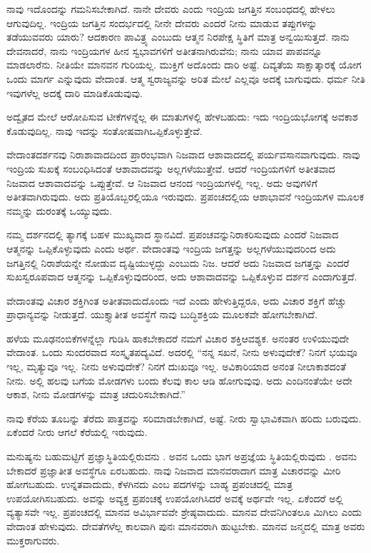 ನಾವು ಇದೊಂದನ್ನು ಗಮನಿಸಬೇಕಾಗಿದೆ. ನಾನೇ ದೇವರು ಎಂದು ಇಂದ್ರಿಯ ಜಗತ್ತಿನ ಸಂಬಂಧದಲ್ಲಿ ಹೇಳಲು ಆಗುವುದಿಲ್ಲ. ಇಂದ್ರಿಯ ಜಗತ್ತಿನ ಸಂದರ್ಭದಲ್ಲಿ ನೀನೇ ದೇವರು ಎಂದರೆ ನೀನು ಮಾಡುವ ತಪ್ಪುಗಳನ್ನು ತಡೆಯುವವರು ಯಾರು? ಆದಕಾರಣ ಪಾವಿತ್ರ್ಯ ಎಂಬುದು ಆತ್ಮನ ನಿರಪೇಕ್ಷ ಸ್ಥಿತಿಗೆ ಮಾತ್ರ ಅನ್ವಯಿಸುತ್ತದೆ. ನಾನು ದೇವನಾದರೆ, ನಾನು ಇಂದ್ರಿಯಗಳ ಹೀನ ಸ್ವಭಾವಗಳಿಗೆ ಅತೀತನಾಗಿರುವೆನು; ನಾನು ಯಾವ ಪಾಪವನ್ನೂ ಮಾಡಲಾರೆನು. ನೀತಿಯೇ ಮಾನವನ ಗುರಿಯಲ್ಲ. ಮುಕ್ತಿಗೆ ಅದೊಂದು ದಾರಿ ಅಷ್ಟೆ. ದಿವ್ಯತೆಯ ಸಾಕ್ಷಾತ್ಕಾರಕ್ಕೆ ಯೋಗ ಒಂದು ಮಾರ್ಗ ಎನ್ನುವುದು ವೇದಾಂತ. ಆತ್ಮ ಸ್ವರಾಜ್ಯವನ್ನು ಅರಿತ ಮೇಲೆ ಎಲ್ಲವೂ ಅದಕ್ಕೆ ಬಾಗುವುದು. ಧರ್ಮ ನೀತಿ ಇವುಗಳೆಲ್ಲ ಅದಕ್ಕೆ ದಾರಿ ಮಾಡಿಕೊಡುವುವು.

ಅದ್ವೈತದ ಮೇಲೆ ಆರೋಪಿಸುವ ಟೀಕೆಗಳನ್ನೆಲ್ಲ ಈ ಮಾತುಗಳಲ್ಲಿ ಹೇಳಬಹುದು: ಇದು ಇಂದ್ರಿಯಭೋಗಕ್ಕೆ ಅವಕಾಶ ಕೊಡುವುದಿಲ್ಲ. ನಾವು ಇದನ್ನು ಸಂತೋಷವಾಗಿ\break ಒಪ್ಪಿಕೊಳ್ಳುತ್ತೇವೆ.

ವೇದಾಂತದರ್ಶನವು ನಿರಾಶಾವಾದದಿಂದ ಪ್ರಾರಂಭವಾಗಿ ನಿಜವಾದ ಆಶಾವಾದದಲ್ಲಿ ಪರ್ಯವಸಾನವಾಗುವುದು. ನಾವು ಇಂದ್ರಿಯ ಸುಖಕ್ಕೆ ಸಂಬಂಧಿಸಿದಂತೆ ಆಶಾವಾದವನ್ನು ಅಲ್ಲಗಳೆಯುತ್ತೇವೆ. ಆದರೆ ಇಂದ್ರಿಯಗಳಿಗೆ ಅತೀತವಾದ ನಿಜವಾದ ಆಶಾವಾದವನ್ನು ಒಪ್ಪುತ್ತೇವೆ. ಆ ನಿಜವಾದ ಆನಂದ ಇಂದ್ರಿಯಗಳಲ್ಲಿ ಇಲ್ಲ. ಅದು ಅವುಗಳಿಗೆ ಅತೀತವಾಗಿರುವುದು. ಅದು ಪ್ರತಿಯೊಬ್ಬರಲ್ಲಿಯೂ ಇರುವುದು. ಪ್ರಪಂಚದಲ್ಲಿಯ ಆಶಾಭಾವನೆ ಇಂದ್ರಿಯಗಳ ಮೂಲಕ ನಮ್ಮನ್ನು ದುರಂತಕ್ಕೆ ಒಯ್ಯುವುದು.

ನಮ್ಮ ದರ್ಶನದಲ್ಲಿ ತ್ಯಾಗಕ್ಕೆ ಬಹಳ ಮುಖ್ಯವಾದ ಸ್ಥಾನವಿದೆ. ಪ್ರಪಂಚವನ್ನು\break ನಿರಾಕರಿಸುವುದು ಎಂದರೆ ನಿಜವಾದ ಆತ್ಮನನ್ನು ಒಪ್ಪಿಕೊಳ್ಳುವುದು ಎಂದು ಅರ್ಥ. ವೇದಾಂತವು ಇಂದ್ರಿಯ ಜಗತ್ತನ್ನು ಅಲ್ಲಗಳೆಯುವುದರಿಂದ ಅದು ಜಗತ್ತಿನಲ್ಲಿ ನಿರಾಶೆಯನ್ನೇ ನೋಡುವ ದೃಷ್ಟಿಯುಳ್ಳದ್ದು ಎಂಬುದು ನಿಜ. ಆದರೆ ಅದು ನಿಜವಾದ ಜಗತ್ತನ್ನು ಎಂದರೆ ಸುಖಸ್ವರೂಪವಾದ ಆತ್ಮನನ್ನು ಒಪ್ಪಿಕೊಳ್ಳುವುದರಿಂದ, ಅದು ಆಶಾವಾದವನ್ನು ಒಪ್ಪಿಕೊಳ್ಳುವ ದರ್ಶನ ಎಂದಾಗುತ್ತದೆ.

\eject

ವೇದಾಂತವು ವಿಚಾರ ಶಕ್ತಿಗಿಂತ ಅತೀತವಾದುದೊಂದು ಇದೆ ಎಂದು ಹೇಳುತ್ತಿದ್ದರೂ, ಅದು ವಿಚಾರ ಶಕ್ತಿಗೆ ಹೆಚ್ಚು ಪ್ರಾಧಾನ್ಯವನ್ನು ನೀಡುತ್ತದೆ. ಯುಕ್ತ್ಯಾತೀತ ಅವಸ್ಥೆಗೆ ನಾವು ಬುದ್ಧಿಶಕ್ತಿಯ ಮೂಲಕವೇ ಹೋಗಬೇಕಾಗಿದೆ.

ಹಳೆಯ ಮೂಢನಂಬಿಕೆಗಳನ್ನೆಲ್ಲಾ ಗುಡಿಸಿ ಹಾಕಬೇಕಾದರೆ ನಮಗೆ ವಿಚಾರ ಶಕ್ತಿ\break ಆವಶ್ಯಕ. ಅನಂತರ ಉಳಿಯುವುದೇ ವೇದಾಂತ. ಒಂದು ಸುಂದರವಾದ ಸಂಸ್ಕೃತ\break ಪದ್ಯವಿದೆ. ಅದರಲ್ಲಿ “ನನ್ನ ಸಖನೆ, ನೀನು ಅಳುವುದೇಕೆ? ನಿನಗೆ ಭಯವೂ ಇಲ್ಲ, ಮೃತ್ಯುವೂ ಇಲ್ಲ. ನೀನು ಅಳುವುದೇಕೆ? ನಿನಗೆ ದುಃಖವೂ ಇಲ್ಲ. ಅವಿಕಾರಿಯಾದ ಅನಂತ ನೀಲಾಕಾಶದಂತೆ ನೀನು. ಅಲ್ಲಿ ಹಲವು ಬಗೆಯ ಮೋಡಗಳು ಬಂದು ಕೆಲವು ಕಾಲ ಆಡಿ ಹೋಗುವುವು. ಅದು ಎಂದಿನಂತೆಯೇ ಅದೇ ಆಕಾಶ, ನೀನು ಮೋಡಗಳನ್ನು ಮಾತ್ರ ಚದುರಿಸಬೇಕಾಗಿದೆ.”

ನಾವು ಕೆರೆಯ ತೂಬನ್ನು ತೆರೆದು ಪಾತ್ರವನ್ನು ಸರಿಮಾಡಬೇಕಾಗಿದೆ, ಅಷ್ಟೆ. ನೀರು ಸ್ವಾಭಾವಿಕವಾಗಿ ಹರಿದು ಬರುವುದು. ಏಕೆಂದರೆ ನೀರು ಆಗಲೆ ಕೆರೆಯಲ್ಲಿ ಇರುವುದು.

ಮನುಷ್ಯನು ಬಹುಮಟ್ಟಿಗೆ ಪ್ರಜ್ಞಾಸ್ಥಿತಿಯಲ್ಲಿರುವನು . ಅವನ ಒಂದು ಭಾಗ ಅಪ್ರಜ್ಞೆಯ ಸ್ಥಿತಿಯಲ್ಲಿರುವುದು . ಅವನು ಬೇಕಾದರೆ ಪ್ರಜ್ಞಾತೀತ ಅವಸ್ಥೆಗೂ  ಏರಬಹುದು. ನಾವು ನಿಜವಾದ ಮಾನವರಾದಾಗ ಮಾತ್ರ ವಿಚಾರವನ್ನು ಮೀರಿ ಹೋಗಬಹುದು. ಉನ್ನತವಾದುದು, ಕೆಳಗಿನದು ಎಂಬ ಪದಗಳನ್ನು ಬಾಹ್ಯ ಪ್ರಪಂಚದಲ್ಲಿ ಮಾತ್ರ ಉಪಯೋಗಿಸಬಹುದು. ಅವನ್ನು ಅವ್ಯಕ್ತ ಪ್ರಪಂಚಕ್ಕೆ ಉಪಯೋಗಿಸಿದರೆ ಅವಕ್ಕೆ ಅರ್ಥವೇ ಇಲ್ಲ. ಏಕೆಂದರೆ ಅಲ್ಲಿ ವ್ಯತ್ಯಾಸವೇ ಇಲ್ಲ. ಪ್ರಪಂಚದಲ್ಲಿ ಮಾನವ ಅವಿರ್ಭಾವವೇ ಶ್ರೇಷ್ಠವಾದುದು. ಮಾನವ ದೇವನಿಗಿಂತಲೂ ಮಿಗಿಲು ಎಂದು ವೇದಾಂತ ಹೇಳುವುದು. ದೇವತೆಗಳೆಲ್ಲ ಕಾಲವಾಗಿ ಪುನಃ ಮಾನವರಾಗಿ ಹುಟ್ಟಬೇಕು. ಮಾನವ ಜನ್ಮದಲ್ಲಿ ಮಾತ್ರ ಅವರು ಮುಕ್ತರಾಗುವರು.

